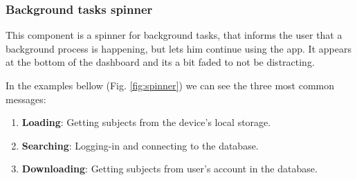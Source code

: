 \clearpage\newpage
\subsubsection{Background tasks spinner}

This component is a spinner for background tasks, that informs the user that a background process is happening, but lets him continue using the app. It appears at the bottom of the dashboard and its a bit faded to not be distracting.

In the examples bellow (Fig. \ref{fig:spinner}) we can see the three most common messages:
\begin{enumerate}[label=\textbf{(\alph*)},noitemsep]
    \item \textbf{Loading}: Getting subjects from the device's local storage.
    \item \textbf{Searching}: Logging-in and connecting to the database.
    \item \textbf{Downloading}: Getting subjects from user's account in the database.
\end{enumerate}

